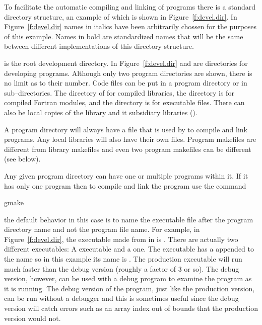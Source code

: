 To facilitate the automatic compiling and linking of programs there is
a standard directory structure, an example of which is shown in
Figure~\ref{f:devel.dir}. In Figure~\ref{f:devel.dir} names in italics
have been arbitrarily chossen for the purposes of this example. Names
in bold are standardized names that will be the same between different
implementations of this directory structure.

 is the root development directory.  In
Figure~\ref{f:devel.dir}  and 
are directories for developing programs. Although only two program
directories are shown, there is no limit as to their number. Code
files can be put in a program directory or in sub--directories. The
 directory of for compiled libraries, the 
directory is for compiled Fortran modules, and the  directory
is for executable files. There can also be local copies of the
 library and it subsidiary libraries ().

A program directory will always have a  file that is used
by  to compile and link programs. Any local libraries will
also have their own  files. Program makefiles are
different from library makefiles and even two program makefiles can 
be different (see below).

Any given program directory can have one or multiple programs within
it. If it has only one program then to compile and link the program
use the command
\begin{example}
  gmake
\end{example}
the default  behavior in this case is to name the executable
file after the program directory name and not the program file
name. For example, in Figure~\ref{f:devel.dir}, the executable made
from  in  is
. There are actually two different executables:
A  executable and a  one. The 
executable has a  appended to the name so in this example its
name is .  The production executable will run
much faster than the debug version (roughly a factor of 3 or so). The
debug version, however, can be used with a debug program to examine
the program as it is running.  The debug version of the program, just
like the production version, can be run without a debugger and this is
sometimes useful since the debug version will catch errors such as an
array index out of bounds that the production version would not.

